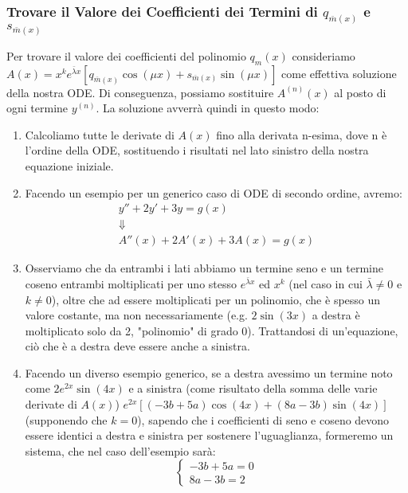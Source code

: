 \documentclass[a4paper,11pt]{article}
\begin{document}
\subsubsection[\texorpdfstring{Coefficienti di $q_{\overline{m}(x)}$ e $s_{\overline{m}(x)}$}{Coefficienti di q(x) ed s(x)}]{Trovare il Valore dei Coefficienti dei Termini di $q_{\overline{m}(x)}$ e $s_{\overline{m}(x)}$}
Per trovare il valore dei coefficienti del polinomio $q_m(x)$ consideriamo $A(x)=x^ke^{\bar{\lambda} x}[q_{\overline{m}(x)}\cos{(\mu x)}+s_{\overline{m}(x)}\sin{(\mu x)}]$ come effettiva soluzione della nostra ODE. Di conseguenza, possiamo sostituire $A^{(n)}(x)$ al posto di ogni termine $y^{(n)}$. La soluzione avverrà quindi in questo modo:
\begin{enumerate}[label=\alph{enumi}.]
	\item Calcoliamo tutte le derivate di $A(x)$ fino alla derivata n-esima, dove n è l'ordine della ODE, sostituendo i risultati nel lato sinistro della nostra equazione iniziale.
	
	\item Facendo un esempio per un generico caso di ODE di secondo ordine, avremo:
    \begin{equation*}
        \begin{array}{c}
            y''+2y'+3y=g(x)\\
            \Downarrow \\
            A''(x)+2A'(x)+3A(x)=g(x)
        \end{array}
    \end{equation*}
	
    \item Osserviamo che da entrambi i lati abbiamo un termine seno e un termine coseno entrambi moltiplicati per uno stesso $e^{\bar{\lambda}x}$ ed $x^k$ (nel caso in cui $\bar{\lambda}\neq 0$ e $k\neq 0$), oltre che ad essere moltiplicati per un polinomio, che è spesso un valore costante, ma non necessariamente (e.g. $2\sin{(3x)}$ a destra è moltiplicato solo da 2, "polinomio" di grado 0). Trattandosi di un'equazione, ciò che è a destra deve essere anche a sinistra.
	
	\item Facendo un diverso esempio generico, se a destra avessimo un termine noto come $2e^{2x}\sin{(4x)}$ e a sinistra (come risultato della somma delle varie derivate di $A(x)$) $e^{2x}[(-3b+5a)\cos{(4x)}+(8a-3b)\sin{(4x)}]$\footnotemark[2] (supponendo che $k=0$), sapendo che i coefficienti di seno e coseno devono essere identici a destra e sinistra per sostenere l'uguaglianza, formeremo un sistema, che nel caso dell'esempio sarà:
    \begin{equation*}
        \begin{cases}
            -3b+5a=0 \\
            8a-3b=2
        \end{cases}
    \end{equation*}
	

\end{enumerate}
\end{document}
